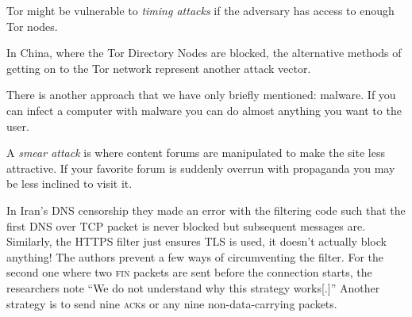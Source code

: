 Tor might be vulnerable to \emph{timing attacks} if the adversary has access to
enough Tor nodes.\cite[p.\@ 9]{wendzelSurveyInternetCensorship2025}

In China, where the Tor Directory Nodes are blocked, the alternative methods of getting on to the Tor network represent another attack vector.

There is another approach that we have only briefly mentioned: malware. If you
can infect a computer with malware you can do almost anything you want to the
user.

A \emph{smear attack} is where content forums are manipulated to make the site
less attractive. If your favorite forum is suddenly overrun with propaganda you
may be less inclined to visit it.

In Iran's DNS censorship they made an error with the filtering code
\cite{bockDetectingEvadingCensorshipDepth} such that the first DNS over TCP
packet is never blocked but subsequent messages are. Similarly, the HTTPS filter
just ensures TLS is used, it doesn't actually block anything! The authors
prevent a few ways of circumventing the filter. For the second one where two
\textsc{fin} packets are sent before the connection starts, the researchers note
``We do not understand why this strategy works[.]'' Another strategy is to send
nine \textsc{ack}s or any nine non-data-carrying packets.
